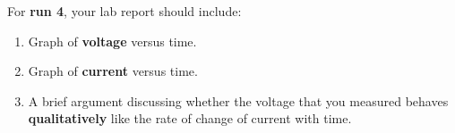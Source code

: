 For \textbf{run 4}, your lab report should include:
\begin{enumerate}
	\item Graph of \textbf{voltage} versus time.
	\item Graph of \textbf{current} versus time.
	\item A brief argument discussing whether the voltage that you measured behaves \textbf{qualitatively} like the rate of change of current with time.
\end{enumerate}